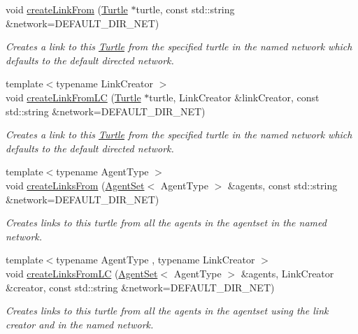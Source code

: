 \begin{DoxyCompactItemize}
void \hyperlink{classrepast_1_1relogo_1_1_turtle_ac1684e6697bc1343e56c00f7abd4895a}{create\-Link\-From} (\hyperlink{classrepast_1_1relogo_1_1_turtle}{Turtle} $\ast$turtle, const std\-::string \&network=D\-E\-F\-A\-U\-L\-T\-\_\-\-D\-I\-R\-\_\-\-N\-E\-T)
\begin{DoxyCompactList}\small\item\em Creates a link to this \hyperlink{classrepast_1_1relogo_1_1_turtle}{Turtle} from the specified turtle in the named network which defaults to the default directed network. \end{DoxyCompactList}\item 
{\footnotesize template$<$typename Link\-Creator $>$ }\\void \hyperlink{classrepast_1_1relogo_1_1_turtle_a46f0a70845533ee57290c2504ab02741}{create\-Link\-From\-L\-C} (\hyperlink{classrepast_1_1relogo_1_1_turtle}{Turtle} $\ast$turtle, Link\-Creator \&link\-Creator, const std\-::string \&network=D\-E\-F\-A\-U\-L\-T\-\_\-\-D\-I\-R\-\_\-\-N\-E\-T)
\begin{DoxyCompactList}\small\item\em Creates a link to this \hyperlink{classrepast_1_1relogo_1_1_turtle}{Turtle} from the specified turtle in the named network which defaults to the default directed network. \end{DoxyCompactList}\item 
{\footnotesize template$<$typename Agent\-Type $>$ }\\void \hyperlink{classrepast_1_1relogo_1_1_turtle_aa8e68c99657df5f7598165ff41f5d5c4}{create\-Links\-From} (\hyperlink{classrepast_1_1relogo_1_1_agent_set}{Agent\-Set}$<$ Agent\-Type $>$ \&agents, const std\-::string \&network=D\-E\-F\-A\-U\-L\-T\-\_\-\-D\-I\-R\-\_\-\-N\-E\-T)
\begin{DoxyCompactList}\small\item\em Creates links to this turtle from all the agents in the agentset in the named network. \end{DoxyCompactList}\item 
{\footnotesize template$<$typename Agent\-Type , typename Link\-Creator $>$ }\\void \hyperlink{classrepast_1_1relogo_1_1_turtle_a6393bfb55e349357a9f90894761027d2}{create\-Links\-From\-L\-C} (\hyperlink{classrepast_1_1relogo_1_1_agent_set}{Agent\-Set}$<$ Agent\-Type $>$ \&agents, Link\-Creator \&creator, const std\-::string \&network=D\-E\-F\-A\-U\-L\-T\-\_\-\-D\-I\-R\-\_\-\-N\-E\-T)
\begin{DoxyCompactList}\small\item\em Creates links to this turtle from all the agents in the agentset using the link creator and in the named network. \end{DoxyCompactList}\item 

\end{DoxyCompactItemize}
